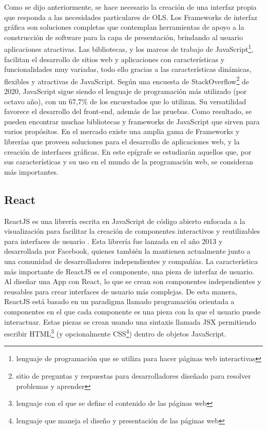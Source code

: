 Como se dijo anteriormente, se hace necesario la creaci\'on de una interfaz propia que responda a las necesidades particulares de OLS. Los Frameworks de interfaz gr\'afica son soluciones completas que contemplan herramientas de apoyo a la construcci\'on de software para la capa de presentaci\'on, brindando al usuario aplicaciones atractivas. Las bibliotecas, y los marcos de trabajo de JavaScript\footnote{lenguaje de programaci\'on que se utiliza para hacer p\'aginas web interactivas}, facilitan el desarrollo de sitios web y aplicaciones con caracter\'isticas y funcionalidades muy variadas, todo ello gracias a las caracter\'isticas din\'amicas, flexibles y atractivas de JavaScript. Seg\'un una encuesta de StackOverflow\footnote{sitio de preguntas y respuestas para desarrolladores dise\~nado para resolver problemas y aprender} de 2020, JavaScript sigue siendo el lenguaje de programaci\'on m\'as utilizado (por octavo a\~no), con un 67,7\% de los encuestados que lo utilizan. Su versatilidad favorece el desarrollo del front-end, adem\'as de las pruebas. Como resultado, se pueden encontrar muchas bibliotecas y frameworks de JavaScript que sirven para varios prop\'ositos. En el mercado existe una amplia gama de Frameworks y librer\'ias que proveen soluciones para el desarrollo de aplicaciones web, y la creaci\'on de interfaces gr\'aficas. En este ep\'igrafe se estudiar\'an aquellos que, por sus caracter\'isticas y su uso en el mundo de la programaci\'on web, se consideran m\'as importantes.


\subsection{React}
ReactJS es una librer\'ia escrita en JavaScript de c\'odigo abierto enfocada a la visualizaci\'on para facilitar la creaci\'on de componentes interactivos y reutilizables para interfaces de usuario \cite{react}. Esta librer\'ia fue lanzada en el a\~no 2013 y desarrollada por Facebook, quienes tambi\'en la mantienen actualmente junto a una comunidad de desarrolladores independientes y compa\~n\'ias. La caracter\'istica m\'as importante de ReactJS es el componente, una pieza de interfaz de usuario. Al dise\~nar una App con React, lo que se crean son componentes independientes y reusables para crear interfaces de usuario m\'as complejas. De esta manera, ReactJS est\'a basado en un paradigma llamado programaci\'on orientada a componentes en el que cada componente es una pieza con la que el usuario puede interactuar. Estas piezas se crean usando una sintaxis llamada JSX \cite{react} permitiendo escribir HTML\footnote{lenguaje con el que se define el contenido de las p\'aginas web} (y opcionalmente CSS\footnote{lenguaje que maneja el dise\~no y presentaci\'on de las p\'aginas web}) dentro de objetos JavaScript.

